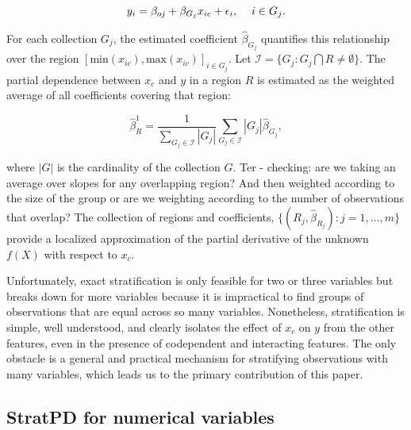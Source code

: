 \documentclass[12pt]{article}
\begin{document}
$$y_i = \beta_{oj} + \beta_{G_j} x_{ic} + \epsilon_i, \hskip 1pc i \in G_j.$$

For each collection $G_j$, the estimated coefficient $\widehat{\beta}_{G_j}$ quantifies this relationship over the region $[\text{min}(x_{ic}), \text{max}(x_{ic})]_{i \in G_j}$. Let $\mathcal{I} = \{G_j: G_j \bigcap R \neq \emptyset\}$. The partial dependence between $x_c$ and $y$ in a region $R$ is estimated as the weighted average of all coefficients covering that region: 

\begin{equation}\label{eq:truebeta}
	\widehat{\beta}^1_R = \dfrac{1}{\displaystyle\sum_{G_j \in \mathcal{I}} |G_j|}\displaystyle\sum_{G_j \in \mathcal{I}}|G_j|\widehat{\beta}_{G_j},
\end{equation}

\noindent where $|G|$ is the cardinality of the collection $G$. {\color{red} Ter - checking: are we taking an average over slopes for any overlapping region? And then weighted according to the size of the group or are we weighting according to the number of observations that overlap?} The collection of regions and coefficients, $\{(R_j, \widehat{\beta}_{R_j}): j = 1, \ldots, m\}$ provide a localized approximation of the partial derivative of the unknown $f(X)$ with respect to $x_c$.

Unfortunately, exact stratification is only feasible for two or three variables but breaks down for more variables because it is impractical to find groups of observations that are equal across so many variables.  Nonetheless, stratification is simple, well understood, and clearly isolates the effect of $x_c$ on $y$ from the other features, even in the presence of codependent and interacting features. The only obstacle is a general and practical mechanism for stratifying observations with many variables, which leads us to the primary contribution of this paper.

\subsection{StratPD for numerical variables}
\end{document}
